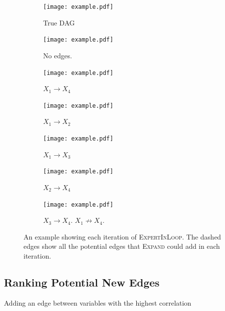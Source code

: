 \documentclass[accepted]{uai2025} %
\begin{document}
\begin{figure}[t!]
	\begin{subfigure}{0.125 \textwidth}
		\centering
		\texttt{[image: example.pdf]}
		\caption{True DAG}
	\end{subfigure}%
	\begin{subfigure}{0.125 \textwidth}
		\centering
		\texttt{[image: example.pdf]}
		\caption{No edges.}
	\end{subfigure}%
	\begin{subfigure}{0.125 \textwidth}
		\centering
		\texttt{[image: example.pdf]}
		\caption{$ X_1 \rightarrow X_4 $}
	\end{subfigure}%
	\begin{subfigure}{0.125 \textwidth}
		\centering
		\texttt{[image: example.pdf]}
		\caption{$ X_1 \rightarrow X_2 $}
	\end{subfigure}
	\begin{subfigure}{0.125 \textwidth}
		\centering
		\texttt{[image: example.pdf]}
		\caption{$ X_1 \rightarrow X_3 $}
	\end{subfigure}%
	\begin{subfigure}{0.125 \textwidth}
		\centering
		\texttt{[image: example.pdf]}
		\caption{$ X_2 \rightarrow X_4 $}
	\end{subfigure}%
	\begin{subfigure}{0.250 \textwidth}
		\centering
		\texttt{[image: example.pdf]}
		\caption{$ X_3 \rightarrow X_4 $. $ X_1 \not \rightarrow X_4 $.}
	\end{subfigure}
	\caption{An example showing each iteration of \textsc{ExpertInLoop}. The dashed edges show all the potential edges that \textsc{Expand} could add in each iteration.}
\end{figure}


\subsection{Ranking Potential New Edges}
\label{sec:ranking}

\begin{algorithm}[h]
\DontPrintSemicolon
\SetAlgoLined
{}
\caption{Adding an edge between variables with the highest correlation}
\label{algo:ranked_expand}
\end{algorithm}
\end{document}
